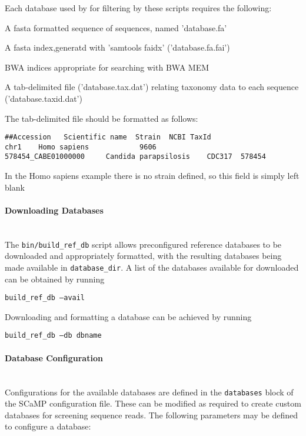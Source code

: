 \documentclass[a4paper,10pt]{article}
\newenvironment{tight_enumerate}{
\begin{enumerate}
  \setlength{\itemsep}{0pt}
  \setlength{\parskip}{0pt}
}{\end{enumerate}}
\newcommand{\para}[1]{\paragraph{#1}\mbox{}\\}
\begin{document}
Each database used by for filtering by these scripts requires the following:

\begin{tight_enumerate}
\item A fasta formatted sequence of sequences, named 'database.fa'
\item A fasta index,generatd with 'samtools faidx' ('database.fa.fai')
\item BWA indices appropriate for searching with BWA MEM 
\item A tab-delimited file ('database.tax.dat') relating taxonomy data to each sequence ('database.taxid.dat')
\end{tight_enumerate}

The tab-delimited file should be formatted as follows:

\begin{verbatim}
##Accession   Scientific name  Strain  NCBI TaxId
chr1    Homo sapiens            9606
578454_CABE01000000     Candida parapsilosis    CDC317  578454
\end{verbatim}

In the Homo sapiens example there is no strain defined, so this field is simply left blank

\para{Downloading Databases}

The {\tt bin/build\_ref\_db} script allows preconfigured reference databases to
be downloaded and appropriately formatted, with the resulting databases being
made available in {\tt database\_dir}. A list of the databases available for
downloaded can be obtained by running

{\tt build\_ref\_db --avail}

Downloading and formatting a database can be achieved by running

{\tt build\_ref\_db --db dbname}

\para{Database Configuration}

Configurations for the available databases are defined in the {\tt databases}
block of the SCaMP configuration file. These can be modified as required to
create custom databases for screening sequence reads. The following parameters
may be defined to configure a database:
\end{document}
